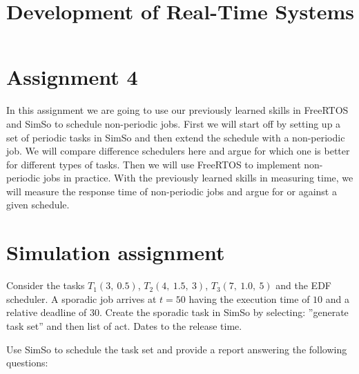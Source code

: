 \documentclass[12pt]{article}
\title{Development of Real-Time Systems}
\begin{document}
\maketitle

\section*{Assignment 4}

In this assignment we are going to use our previously learned skills in FreeRTOS and SimSo to schedule non-periodic jobs. First we will start off by setting up a set of periodic tasks in SimSo and then extend the schedule with a non-periodic job. We will compare difference schedulers here and argue for which one is better for different types of tasks. Then we will use FreeRTOS to implement non-periodic jobs in practice. With the previously learned skills in measuring time, we will measure the response time of non-periodic jobs and argue for or against a given schedule. 

\section{Simulation assignment}

Consider the tasks $T_{1}(3,\ 0.5)$, $T_{2}(4,\ 1.5,\ 3)$, $T_{3}(7,\ 1.0,\ 5)$ and the EDF scheduler. A sporadic job arrives at $t=50$ having the execution time of $10$ and a relative deadline of $30$. Create the sporadic task in SimSo by selecting: ”generate task set” and then list of act. Dates to the release time.

Use SimSo to schedule the task set and provide a report answering the following questions:
\end{document}
